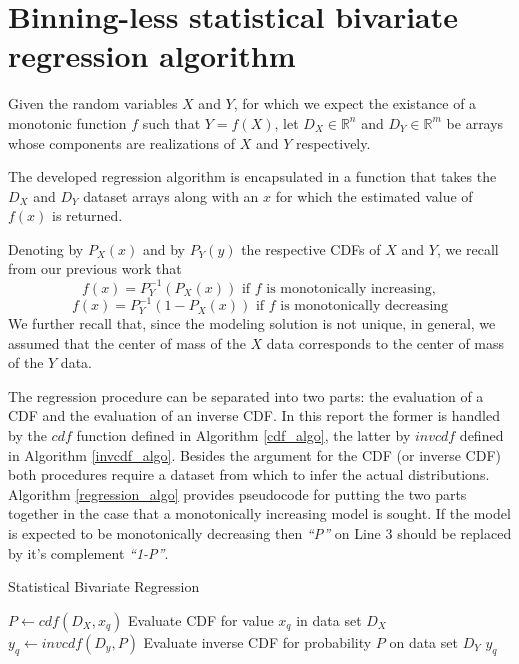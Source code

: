 \documentclass[10pt,final]{siamltex}
\begin{document}
\section{Binning-less statistical bivariate regression algorithm}\label{blsbr}
%
Given the random variables $X$ and $Y$, for which we expect the existance of a monotonic function $f$ such that $Y=f(X)$, let $D_X \in \mathbb{R}^n$ and $D_Y \in \mathbb{R}^m$ be arrays whose components are realizations of $X$ and $Y$ respectively.

The developed regression algorithm is encapsulated in a function that takes the $D_X$ and $D_Y$ dataset arrays along with an $x$ for which the estimated value of $f(x)$ is returned.

Denoting by $P_X(x)$ and by $P_Y(y)$ the respective CDFs of $X$ and $Y$, we recall from our previous work \cite{fiori,fgl} that
\begin{equation}
  f(x)=P_Y^{-1}(P_X(x)) \text{ if $f$ is monotonically increasing},
\end{equation}
\begin{equation}
  f(x)=P_Y^{-1}(1-P_X(x)) \text{ if $f$ is monotonically decreasing}
\end{equation}
We further recall that, since the modeling solution is not unique, in general, we assumed that the center of mass of the $X$ data corresponds to the center of mass of the $Y$ data.

The regression procedure can be separated into two parts: the evaluation of a CDF and the evaluation of an inverse CDF. In this report the former is handled by the $cdf$ function defined in Algorithm \ref{cdf_algo}, the latter by $invcdf$ defined in Algorithm \ref{invcdf_algo}. Besides the argument for the CDF (or inverse CDF) both procedures require a dataset from which to infer the actual distributions. Algorithm \ref{regression_algo} provides pseudocode for putting the two parts together in the case that a monotonically increasing model is sought. If the model is expected to be monotonically decreasing then \textit{``P''} on Line 3 should be replaced by it's complement \textit{``1-P''}.

\begin{algorithm}
  \caption{Statistical Bivariate Regression}
  \label{regression_algo}
  \begin{algorithmic}[1]
    \State $P \gets cdf(D_X, x_q)$
    \Comment Evaluate CDF for value $x_q$ in data set $D_X$
    \State $y_q \gets invcdf(D_y, P)$
    \Comment Evaluate inverse CDF for probability $P$ on data set $D_Y$
    \State \Return $y_q$
    \EndFunction
  \end{algorithmic}
\end{algorithm}
\end{document}
